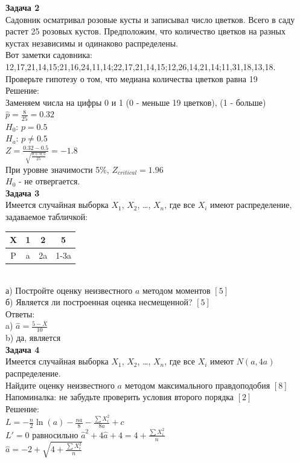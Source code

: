 \documentclass[12pt, a4paper]{article}\usepackage[]{graphicx}\usepackage[]{color}
\begin{document}
\textbf{Задача 2} \\ %
Садовник осматривал розовые кусты и записывал число цветков. Всего в саду растет 25 розовых кустов. Предположим, что количество цветков на разных кустах независимы и одинаково распределены. \\
Вот заметки садовника: \\
12,17,21,14,15;21,16,24,11,14;22,17,21,14,15;12,26,14,21,14;11,31,18,13,18.\\
Проверьте гипотезу о том, что медиана количества цветков равна 19\\
Решение: \\
Заменяем числа на цифры 0 и 1 (0 - меньше 19 цветков), (1 - больше) \\
$\hat{p}=\frac{8}{25}=0.32$ \\
$H_{0}$: $p=0.5$ \\
$H_{a}$: $p\neq 0.5$ \\
$Z=\frac{0.32-0.5}{\sqrt{\frac{0.5\cdot 0.5}{25}}}=-1.8$ \\
При уровне значимости 5\%, $Z_{critical}=1.96$ \\
$H_{0}$ - не отвергается. \\

\textbf{Задача 3} \\ %
Имеется случайная выборка $X_{1}$, $X_{2}$, \ldots, $X_{n}$, где все $X_{i}$ имеют распределение, задаваемое табличкой: \\
\begin{tabular}{|c|c|c|c|}
\hline
X & 1 & 2 & 5 \\
\hline
P & a & 2a & 1-3a \\
\hline
\end{tabular} \\
а) Постройте оценку неизвестного $a$ методом моментов $[5]$ \\
б) Является ли построенная оценка несмещенной? $[5]$ \\
Ответы: \\
a) $\hat{a}=\frac{5-\bar{X}}{10}$ \\
b) да, является \\


\textbf{Задача 4} \\ %
Имеется случайная выборка $X_{1}$, $X_{2}$, \ldots, $X_{n}$, где все $X_{i}$ имеют $N(a,4a)$ распределение. \\
Найдите оценку неизвестного $a$ методом максимального правдоподобия $[8]$  \\
Напоминалка: не забудьте проверить условия второго порядка $[2]$ \\
Решение: \\
$L=-\frac{n}{2}\ln(a)-\frac{na}{8}-\frac{\sum X_{i}^{2}}{8a}+c$ \\
$L'=0$ равносильно $\hat{a}^{2}+4\hat{a}+4=4+\frac{\sum X_{i}^{2}}{n}$ \\
$\hat{a}=-2+\sqrt{4+\frac{\sum X_{i}^{2}}{n}}$ \\
\end{document}
